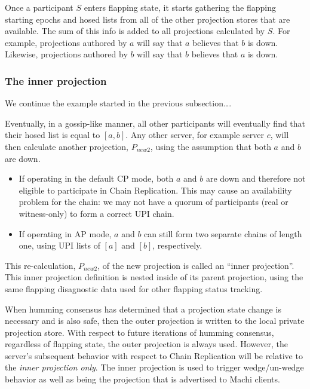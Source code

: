 \documentclass[preprint,10pt]{sigplanconf}
\begin{document}
Once a participant $S$ enters flapping state, it starts gathering the
flapping starting epochs and hosed lists from all of the other
projection stores that are available.  The sum of this info is added
to all projections calculated by $S$.
For example, projections authored by $a$ will say that $a$ believes
that $b$ is down. 
Likewise, projections authored by $b$ will say that $b$ believes
that $a$ is down. 

\subsubsection{The inner projection}
\label{ssec:inner-projection}

We continue the example started in the previous subsection\ldots.

Eventually, in a gossip-like manner, all other participants will
eventually find that their hosed list is equal to $[a,b]$.  Any other
server, for example server $c$, will then calculate another
projection, $P_{new2}$, using the assumption that both $a$ and $b$
are down.

\begin{itemize}
\item If operating in the default CP mode, both $a$ and $b$ are down
  and therefore not eligible to participate in Chain Replication.
  This may cause an availability problem for the chain: we may not
  have a quorum of participants (real or witness-only) to form a
  correct UPI chain.
\item If operating in AP mode, $a$ and $b$ can still form two separate
  chains of length one, using UPI lists of $[a]$ and $[b]$, respectively. 
\end{itemize}

This re-calculation, $P_{new2}$, of the new projection is called an
``inner projection''.  This inner projection definition is nested
inside of its parent projection, using the same flapping disagnostic
data used for other flapping status tracking.

When humming consensus has determined that a projection state change
is necessary and is also safe, then the outer projection is written to
the local private projection store.
With respect to future iterations of
humming consensus, regardless of flapping state, the outer projection
is always used.
However, the server's subsequent
behavior with respect to Chain Replication will be relative to the
{\em inner projection only}.  The inner projection is used to trigger
wedge/un-wedge behavior as well as being the projection that is
advertised to Machi clients.
\end{document}
